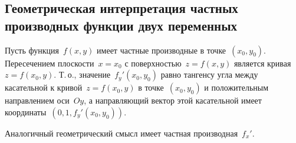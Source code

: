 \subsection{Геометрическая интерпретация частных производных функции двух переменных}
Пусть функция~$f(x, y)$ имеет частные производные в точке~$(x_0, y_0)$.
Пересечением плоскости~$x = x_0$ с поверхностью~$z = f(x, y)$ является кривая~$z = f(x_0, y)$.
Т.\,о., значение~$f_y'(x_0, y_0)$ равно тангенсу угла между касательной к кривой~$z = f(x_0, y)$ в точке~$(x_0, y_0)$ и положительным направлением оси~$Oy$, а направляющий вектор этой касательной имеет координаты~$(0, 1, f_y'(x_0, y_0))$.

Аналогичный геометрический смысл имеет частная производная~$f_x'$.